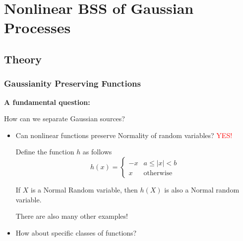 \documentclass[usenames,dvipsnames]{beamer}
\begin{document}
\section{Nonlinear BSS of Gaussian Processes}
\subsection{Theory}
\begin{frame}
\frametitle{Gaussianity Preserving Functions}
\textbf{A fundamental question:}

How can we separate Gaussian sources?

\pause
\begin{itemize}
\item Can nonlinear functions preserve Normality of random variables? \pause \textcolor{red}{YES!}

\begin{example}
Define the function $h$ as follows
\begin{equation*}
\label{E_CounterExampleOneDimensionalDiscontinued}
h(x)=
\begin{cases}
-x & a \leq |x| < b \\
x & \text{otherwise}
\end{cases}
\end{equation*}

If $X$ is a Normal Random variable, then $h(X)$ is also a Normal random variable.

\end{example}

\noindent
There are also many other examples! 

\pause
\item How about specific classes of functions?
\end{itemize}
\end{frame}
\end{document}
